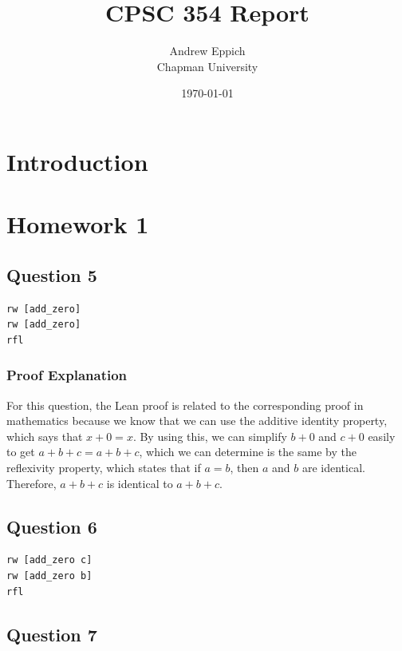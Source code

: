 \documentclass{article}
\title{CPSC 354 Report}
\author{Andrew Eppich  \\ Chapman University}
\date{\today}
\theoremstyle{plain}
\theoremstyle{definition}
\theoremstyle{remark}
\begin{document}
\maketitle

\begin{abstract}

\end{abstract}

\tableofcontents

\section{Introduction}\label{intro}

\section{Homework 1}\label{homework1}

\subsection{Question 5}

\begin{lstlisting}
rw [add_zero]
rw [add_zero]
rfl
\end{lstlisting}

\subsubsection{Proof Explanation}

For this question, the Lean proof is related to the corresponding proof in mathematics because we know that we can use the additive identity property, which says that \(x + 0 = x\). By using this, we can simplify \(b + 0\) and \(c + 0\) easily to get \(a + b + c = a + b + c\), which we can determine is the same by the reflexivity property, which states that if \(a = b\), then \(a\) and \(b\) are identical. Therefore, \(a + b + c\) is identical to \(a + b + c\).

\subsection{Question 6}

\begin{lstlisting}
rw [add_zero c]
rw [add_zero b]
rfl
\end{lstlisting}


\subsection{Question 7}
\end{document}
